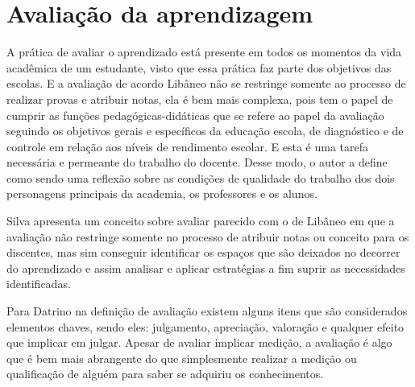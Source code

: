 \section{Avaliação da aprendizagem}
\noindent A prática de avaliar o aprendizado está presente em todos os momentos da vida acadêmica de um estudante, visto que essa prática faz parte dos objetivos das escolas. E a avaliação de acordo Libâneo \cite{1990:libaneo} não se restringe somente ao processo de realizar provas e atribuir notas, ela é bem mais complexa, pois tem o papel de cumprir as funções pedagógicas-didáticas que se refere ao papel da avaliação seguindo os objetivos gerais e específicos da educação escola, de diagnóstico e de controle em relação aos níveis de rendimento escolar. E esta é uma tarefa necessária e permeante do trabalho do docente. Desse modo, o autor a define como sendo uma reflexão sobre as condições de qualidade do trabalho dos dois personagens principais da academia, os professores e os alunos.

Silva \cite{2015:Silva} apresenta um conceito sobre avaliar parecido com o de Libâneo \cite{1990:libaneo} em que a avaliação não restringe somente no processo de atribuir notas ou conceito para os discentes, mas sim conseguir identificar os espaços que são deixados no decorrer do aprendizado e assim analisar e aplicar estratégias a fim suprir as necessidades identificadas.

Para Datrino \cite{2010:Datrino} na definição de avaliação existem alguns itens que são considerados elementos chaves, sendo eles: julgamento, apreciação, valoração e qualquer efeito que implicar em julgar. Apesar de avaliar implicar medição, a avaliação é algo que é bem mais abrangente do que simplesmente realizar a medição ou qualificação de alguém para saber se adquiriu os conhecimentos.
